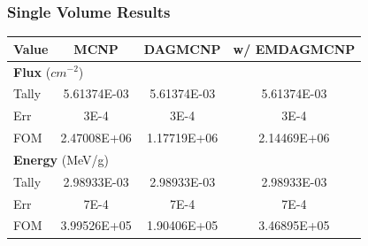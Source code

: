 \documentclass[12pt]{beamer}
\begin{document}
\begin{frame}
\frametitle{Single Volume Results}

\begin{table}[h]

  \begin{center}

    \begin{tabular}{lccc}
     \toprule
      Value & MCNP & DAGMCNP & w/ EMDAGMCNP \\
     \toprule
     \multicolumn{4}{l}{\textbf{Flux} ($cm^{-2}$)} \\
     \hline
     Tally & 5.61374E-03 & 5.61374E-03 & 5.61374E-03 \\
     Err & 3E-4 & 3E-4 & 3E-4  \\
     FOM & 2.47008E+06 & 1.17719E+06 & 2.14469E+06 \\
     \hline
     \multicolumn{4}{l}{\textbf{Energy} (MeV/g)} \\
     \hline
     Tally & 2.98933E-03 & 2.98933E-03 & 2.98933E-03 \\
     Err & 7E-4 & 7E-4 & 7E-4 \\
     FOM & 3.99526E+05 & 1.90406E+05 & 3.46895E+05 \\
     \bottomrule
     
    \end{tabular}


  \end{center}
\vspace{-0.4cm}
\end{table}

\end{frame}
\end{document}
